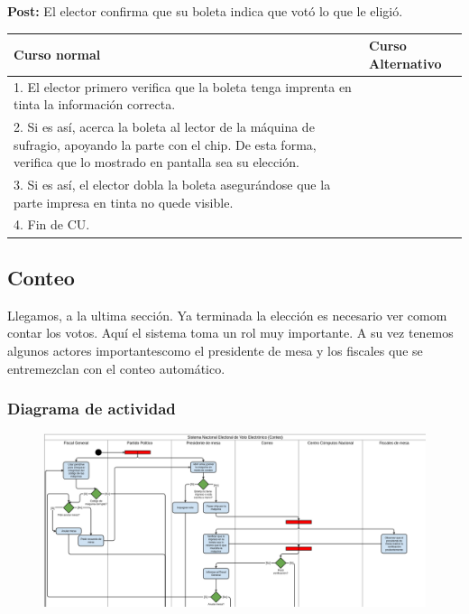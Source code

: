 \textbf{Post:} El elector confirma que su boleta indica que votó lo que le eligió.

\begin{table}[h!]
	
 \begin{tabular}{|p{7.5cm} | p{7.5cm}|} 
 \hline
 \textbf{Curso normal} & \textbf{Curso Alternativo} \\
 \hline
 1. El elector primero verifica que la boleta tenga imprenta en tinta la información correcta. & \\
\hline

2. Si es así, acerca la boleta al lector de la máquina de sufragio, apoyando la parte con el chip. De esta forma, verifica que lo mostrado en pantalla sea su elección. & \\
\hline

3. Si es así, el elector dobla la boleta asegurándose que la parte impresa en tinta no quede visible. & \\
\hline

4. Fin de CU. & \\
\hline
\end{tabular}
\end{table}

\newpage

\subsection{Conteo}

Llegamos, a la ultima sección. Ya terminada la elección es necesario ver comom contar los votos. Aquí el sistema toma un rol muy importante. A su vez tenemos algunos actores importantescomo el presidente de mesa y los fiscales que se entremezclan con el conteo automático.

\subsubsection{Diagrama de actividad}

\begin{figure}[h!]
\centering
\includegraphics[scale=0.45]{imagenes/actividad/actividadConteo1}
\end{figure}			


